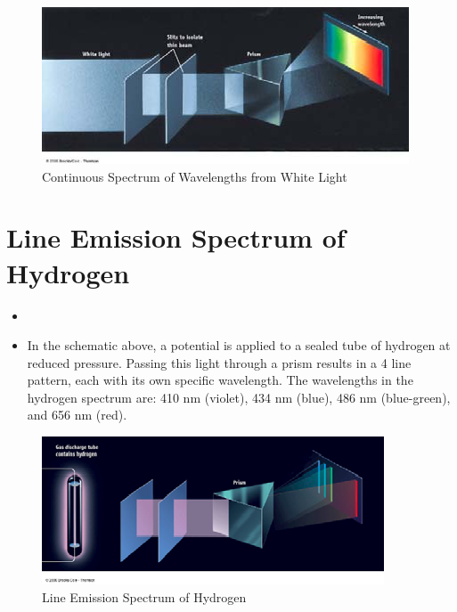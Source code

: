 \documentclass[
	chapter=7,
	title={Quantum Theory {\&} the Electronic Structure of Atoms},
	showanswers=true,
]{chem122notes}
\begin{document}
\begin{figure}[H]
	\centering
	\includegraphics[width=\textwidth]{chapter7/continuous-spectrum}
	\caption{Continuous Spectrum of Wavelengths from White Light}
	\label{fig:continuous-spectrum}
\end{figure}

\section{Line Emission Spectrum of Hydrogen}\label{sec:line-emission-spectrum-of-hydrogen}
\begin{itemize}
	\item {}
	\item In the schematic above, a potential is applied to a sealed tube of hydrogen at reduced pressure.
	Passing this light through a prism results in a 4 line pattern, each with its own specific wavelength.
	The wavelengths in the hydrogen spectrum are: 410 nm (violet), 434 nm (blue), 486 nm (blue-green), and 656 nm (red).
\end{itemize}

\begin{figure}[H]
	\centering
	\includegraphics[width=\textwidth]{chapter7/line_emission}
	\caption{Line Emission Spectrum of Hydrogen}
	\label{fig:line-emission}
\end{figure}
\end{document}
